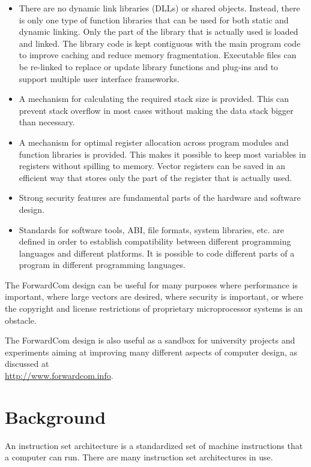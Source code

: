 \documentclass[forwardcom.tex]{subfiles}
\begin{document}
\begin{itemize}
\item There are no dynamic link libraries (DLLs) or shared objects. Instead, there is only one type of function libraries 
that can be used for both static and dynamic linking. Only the part of the library that is actually used is loaded and linked. The library code is kept contiguous with the main program code to improve caching and reduce memory fragmentation. 
Executable files can be re-linked to replace or update library functions and plug-ins and to support multiple user interface frameworks.

\item A mechanism for calculating the required stack size is provided. This can prevent stack overflow in most cases without making the data stack bigger than necessary.

\item A mechanism for optimal register allocation across program modules and function libraries is provided. This makes it possible to keep most variables in registers without spilling to memory. Vector registers can be saved in an efficient way that stores only the part of the register that is actually used.

\item Strong security features are fundamental parts of the hardware and software design.

\item Standards for software tools, ABI, file formats, system libraries, etc. are defined in order to establish compatibility between different programming languages and different platforms. It is possible to code different parts of a program in different programming languages.

\end{itemize}
\vv

The ForwardCom design can be useful for many purposes where performance is important, where large vectors are desired, where security is important, or where the copyright and license restrictions of proprietary microprocessor systems is an obstacle. 

\vv
The ForwardCom design is also useful as a sandbox for university projects and experiments aiming at improving many different aspects of computer design, as discussed at \\
\href{http://www.forwardcom.info}{http://www.forwardcom.info}.

\section{Background}
An instruction set architecture is a standardized set of machine instructions that a computer can run. There are many instruction set architectures in use.
\vv
\end{document}
